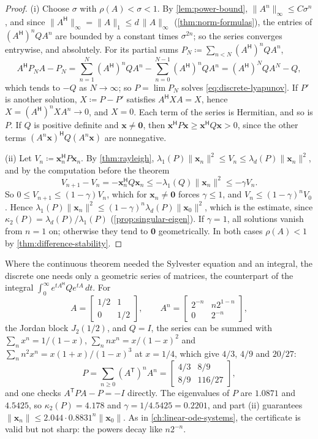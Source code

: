 \begin{proof}
(i) Choose $\sigma$ with $\rho(A)<\sigma<1$. By \cref{lem:power-bound}, $\|A^n\|_\infty\le C\sigma^n$, and since $\|A^{\mathsf H}\|_\infty=\|A\|_1\le d\,\|A\|_\infty$ (\cref{thm:norm-formulas}), the entries of $(A^{\mathsf H})^nQA^n$ are bounded by a constant times $\sigma^{2n}$; so the series converges entrywise, and absolutely. For its partial sums $P_N\coloneqq\sum_{n<N}(A^{\mathsf H})^nQA^n$,
\[
A^{\mathsf H}P_NA-P_N=\sum_{n=1}^{N}(A^{\mathsf H})^nQA^n-\sum_{n=0}^{N-1}(A^{\mathsf H})^nQA^n=(A^{\mathsf H})^NQA^N-Q ,
\]
which tends to $-Q$ as $N\to\infty$; so $P=\lim P_N$ solves \eqref{eq:discrete-lyapunov}. If $P'$ is another solution, $X\coloneqq P-P'$ satisfies $A^{\mathsf H}XA=X$, hence $X=(A^{\mathsf H})^nXA^n\to0$, and $X=0$. Each term of the series is Hermitian, and so is $P$. If $Q$ is positive definite and $\mathbf x\ne\mathbf 0$, then $\mathbf x^{\mathsf H}P\mathbf x\ge\mathbf x^{\mathsf H}Q\mathbf x>0$, since the other terms $(A^n\mathbf x)^{\mathsf H}Q(A^n\mathbf x)$ are nonnegative.

(ii) Let $V_n\coloneqq\mathbf x_n^{\mathsf H}P\mathbf x_n$. By \cref{thm:rayleigh}, $\lambda_1(P)\|\mathbf x_n\|^2\le V_n\le\lambda_d(P)\|\mathbf x_n\|^2$, and by the computation before the theorem
\[
V_{n+1}-V_n=-\mathbf x_n^{\mathsf H}Q\mathbf x_n\le-\lambda_1(Q)\|\mathbf x_n\|^2\le-\gamma V_n .
\]
So $0\le V_{n+1}\le(1-\gamma)V_n$, which for $\mathbf x_n\ne\mathbf 0$ forces $\gamma\le1$, and $V_n\le(1-\gamma)^nV_0$. Hence $\lambda_1(P)\|\mathbf x_n\|^2\le(1-\gamma)^n\lambda_d(P)\|\mathbf x_0\|^2$, which is the estimate, since $\kappa_2(P)=\lambda_d(P)/\lambda_1(P)$ (\cref{prop:singular-eigen}). If $\gamma=1$, all solutions vanish from $n=1$ on; otherwise they tend to $\mathbf 0$ geometrically. In both cases $\rho(A)<1$ by \cref{thm:difference-stability}.
\end{proof}

Where the continuous theorem needed the Sylvester equation and an integral, the discrete one needs only a geometric series of matrices, the counterpart of the integral $\int_0^\infty e^{tA^{\mathsf H}}Qe^{tA}\,dt$. For
\[
A=\begin{bmatrix}1/2&1\\0&1/2\end{bmatrix},\qquad A^n=\begin{bmatrix}2^{-n}&n2^{1-n}\\0&2^{-n}\end{bmatrix},
\]
the Jordan block $J_2(1/2)$, and $Q=I$, the series can be summed with $\sum_nx^n=1/(1-x)$, $\sum_nnx^n=x/(1-x)^2$ and $\sum_nn^2x^n=x(1+x)/(1-x)^3$ at $x=1/4$, which give $4/3$, $4/9$ and $20/27$:
\[
P=\sum_{n\ge0}(A^{\mathsf T})^nA^n=\begin{bmatrix}4/3&8/9\\8/9&116/27\end{bmatrix},
\]
and one checks $A^{\mathsf T}PA-P=-I$ directly. The eigenvalues of $P$ are $1.0871$ and $4.5425$, so $\kappa_2(P)=4.178$ and $\gamma=1/4.5425=0.2201$, and part (ii) guarantees $\|\mathbf x_n\|\le2.044\cdot0.8831^n\|\mathbf x_0\|$. As in \cref{ch:linear-ode-systems}, the certificate is valid but not sharp: the powers decay like $n2^{-n}$.

